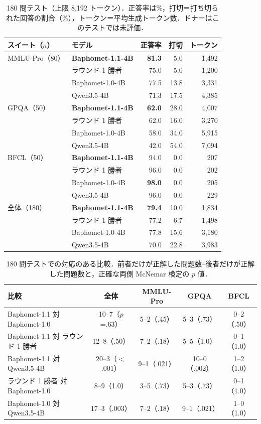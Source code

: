 \begin{table}[htbp]
\centering\small
\caption{180 問テスト（上限 8,192 トークン）．正答率は\%，打切＝打ち切られた回答の割合（\%），トークン＝平均生成トークン数．ドナーはこのテストでは未評価．}
\label{tab:test}
\setlength{\tabcolsep}{4pt}
\begin{tabular}{llrrr}
\toprule
スイート（$n$） & モデル & 正答率 & 打切 & トークン \\
\midrule
MMLU-Pro（80） & \textbf{Baphomet-1.1-4B} & \textbf{81.3} & 5.0 & 1,492 \\
 & ラウンド 1 勝者 & 75.0 & 5.0 & 1,200 \\
 & Baphomet-1.0-4B & 77.5 & 13.8 & 3,331 \\
 & Qwen3.5-4B & 71.3 & 17.5 & 4,385 \\
\midrule
GPQA（50） & \textbf{Baphomet-1.1-4B} & \textbf{62.0} & 28.0 & 4,007 \\
 & ラウンド 1 勝者 & 62.0 & 16.0 & 3,270 \\
 & Baphomet-1.0-4B & 58.0 & 34.0 & 5,915 \\
 & Qwen3.5-4B & 42.0 & 54.0 & 7,094 \\
\midrule
BFCL（50） & \textbf{Baphomet-1.1-4B} & 94.0 & 0.0 & 207 \\
 & ラウンド 1 勝者 & 96.0 & 0.0 & 202 \\
 & Baphomet-1.0-4B & \textbf{98.0} & 0.0 & 205 \\
 & Qwen3.5-4B & 96.0 & 0.0 & 229 \\
\midrule
全体（180） & \textbf{Baphomet-1.1-4B} & \textbf{79.4} & 10.0 & 1,834 \\
 & ラウンド 1 勝者 & 77.2 & 6.7 & 1,498 \\
 & Baphomet-1.0-4B & 77.8 & 15.6 & 3,180 \\
 & Qwen3.5-4B & 70.0 & 22.8 & 3,983 \\
\bottomrule
\end{tabular}
\end{table}

\begin{table}[htbp]
\centering\small
\caption{180 問テストでの対応のある比較．前者だけが正解した問題数--後者だけが正解した問題数と，正確な両側 McNemar 検定の $p$ 値．}
\label{tab:mcnemar}
\setlength{\tabcolsep}{4pt}
\begin{tabular}{lcccc}
\toprule
比較 & 全体 & MMLU-Pro & GPQA & BFCL \\
\midrule
Baphomet-1.1 対 Baphomet-1.0 & 10--7（$p$=.63） & 5--2（.45） & 5--3（.73） & 0--2（.50） \\
Baphomet-1.1 対 ラウンド 1 勝者 & 12--8（.50） & 7--2（.18） & 5--5（1.0） & 0--1（1.0） \\
Baphomet-1.1 対 Qwen3.5-4B & 20--3（$<$.001） & 9--1（.021） & 10--0（.002） & 1--2（1.0） \\
ラウンド 1 勝者 対 Baphomet-1.0 & 8--9（1.0） & 3--5（.73） & 5--3（.73） & 0--1（1.0） \\
Baphomet-1.0 対 Qwen3.5-4B & 17--3（.003） & 7--2（.18） & 9--1（.021） & 1--0（1.0） \\
\bottomrule
\end{tabular}
\end{table}

